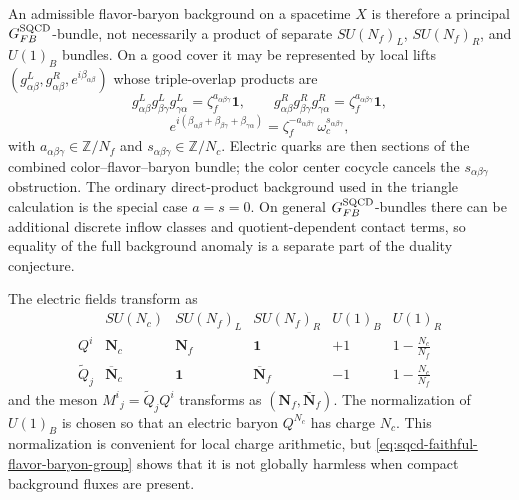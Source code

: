 An admissible flavor-baryon background on a spacetime \(X\) is therefore a
principal \(G_{FB}^{\rm SQCD}\)-bundle, not necessarily a product of separate
\(SU(N_f)_L\), \(SU(N_f)_R\), and \(U(1)_B\) bundles.  On a good cover it may
be represented by local lifts
\((g^L_{\alpha\beta},g^R_{\alpha\beta},e^{i\beta_{\alpha\beta}})\) whose
triple-overlap products are
\[
  g^L_{\alpha\beta}g^L_{\beta\gamma}g^L_{\gamma\alpha}
  =
  \zeta_f^{a_{\alpha\beta\gamma}}\mathbf 1,
  \qquad
  g^R_{\alpha\beta}g^R_{\beta\gamma}g^R_{\gamma\alpha}
  =
  \zeta_f^{a_{\alpha\beta\gamma}}\mathbf 1,
\]
\begin{equation}
  e^{i(\beta_{\alpha\beta}+\beta_{\beta\gamma}
  +\beta_{\gamma\alpha})}
  =
  \zeta_f^{-a_{\alpha\beta\gamma}}\,
  \omega_c^{s_{\alpha\beta\gamma}},
  \label{eq:sqcd-admissible-background-cocycles}
\end{equation}
with \(a_{\alpha\beta\gamma}\in\mathbb Z/N_f\) and
\(s_{\alpha\beta\gamma}\in\mathbb Z/N_c\).  Electric quarks are then sections
of the combined color--flavor--baryon bundle; the color center cocycle cancels
the \(s_{\alpha\beta\gamma}\) obstruction.  The ordinary direct-product
background used in the triangle calculation is the special case
\(a=s=0\).  On general \(G_{FB}^{\rm SQCD}\)-bundles there can be additional
discrete inflow classes and quotient-dependent contact terms, so equality of
the full background anomaly is a separate part of the duality conjecture.

The electric fields transform as
\[
\begin{array}{c|c|c|c|c|c}
  & SU(N_c) & SU(N_f)_L & SU(N_f)_R & U(1)_B & U(1)_R \\ \hline
  Q^i & \mathbf N_c & \mathbf N_f & \mathbf 1
      & +1 & 1-\frac{N_c}{N_f} \\
  \widetilde Q_j & \overline{\mathbf N}_c & \mathbf 1
      & \overline{\mathbf N}_f
      & -1 & 1-\frac{N_c}{N_f}
\end{array}
\]
and the meson \(M^i{}_j=\widetilde Q_jQ^i\) transforms as
\((\mathbf N_f,\overline{\mathbf N}_f)\).  The normalization of
\(U(1)_B\) is chosen so that an electric baryon \(Q^{N_c}\) has charge
\(N_c\).  This normalization is convenient for local charge arithmetic, but
\eqref{eq:sqcd-faithful-flavor-baryon-group} shows that it is not globally
harmless when compact background fluxes are present.


